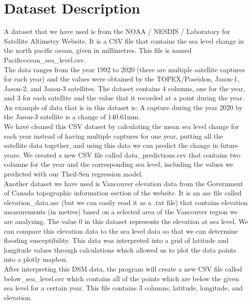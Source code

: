 \documentclass[fontsize=11pt]{article}
\begin{document}
    \section*{Dataset Description}

    \hspace{\parindent}A dataset that we have used is from the NOAA / NESDIS / Laboratory for Satellite Altimetry Website. It is a CSV file that contains the sea level change in the north pacific ocean, given in millimetres. This file is named Pacificocean\_sea\_level.csv. \\

    The data ranges from the year 1992 to 2020  (there are multiple satellite captures for each year) and the values were obtained by the TOPEX/Poseidon, Jason-1, Jason-2, and Jason-3 satellites. The dataset contains 4 columns, one for the year, and 3 for each satellite and the value that it recorded at a point during the year. An example of data that is in this dataset is: A capture during the year 2020 by the Jason-3 satellite is a change of 140.61mm. \\

    We have cleaned this CSV dataset by calculating the mean sea level change for each year instead of having multiple captures for one year, putting all the satellite data together, and using this data we can predict the change in future years. We created a new CSV file called data\_predictions.csv that contains two columns for the year and the corresponding sea level, including the values we predicted with our Theil-Sen regression model.  \\

    Another dataset we have used is Vancouver elevation data from the Government of Canada topographic information section of the website. It is an asc file called elevation\_data.asc (but we can easily read it as a .txt file) that contains elevation measurements (in metres) based on a selected area of the Vancouver region we are analyzing. The value 0 in this dataset represents the elevation at sea level. We can compare this elevation data to the sea level data so that we can determine flooding susceptibility. This data was interpreted into a grid of latitude and longitude values through calculations which allowed us to plot the data points into a plotly mapbox. \\

    After interpreting this DSM data, the program will create a new CSV file called below\_sea\_level.csv which contains all of the points which are below the given sea level for a certain year. This file contains 3 columns, latitude, longitude, and elevation. \\
\end{document}
